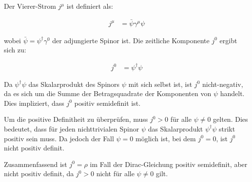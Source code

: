 \documentclass[11pt,a4paper]{article}
\begin{document}
Der Vierer-Strom $j^\mu$ ist definiert als:

\begin{align*}
j^\mu &= \bar{\psi} \gamma^\mu \psi
\end{align*}

wobei $\bar{\psi} = \psi^\dagger \gamma^0$ der adjungierte Spinor ist. Die zeitliche Komponente $j^0$ ergibt sich zu:

\begin{align*}
j^0 &= \psi^\dagger \psi
\end{align*}

Da $\psi^\dagger \psi$ das Skalarprodukt des Spinors $\psi$ mit sich selbst ist, ist $j^0$ nicht-negativ, da es sich um die Summe der Betragsquadrate der Komponenten von $\psi$ handelt. Dies impliziert, dass $j^0$ positiv semidefinit ist.

Um die positive Definitheit zu überprüfen, muss $j^0 > 0$ für alle $\psi \neq 0$ gelten. Dies bedeutet, dass für jeden nichttrivialen Spinor $\psi$ das Skalarprodukt $\psi^\dagger \psi$ strikt positiv sein muss. Da jedoch der Fall $\psi = 0$ möglich ist, bei dem $j^0 = 0$, ist $j^0$ nicht positiv definit.

Zusammenfassend ist $j^0 = \rho$ im Fall der Dirac-Gleichung positiv semidefinit, aber nicht positiv definit, da $j^0 > 0$ nicht für alle $\psi \neq 0$ gilt.

\end{document}

